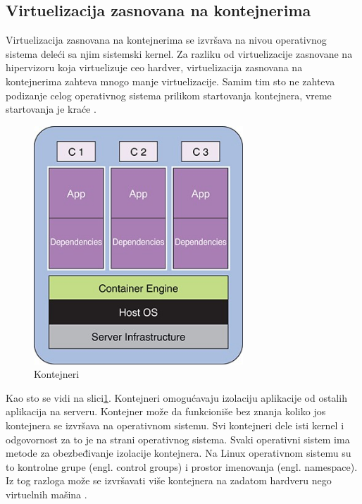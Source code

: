 \documentclass[12pt,oneside]{memoir}
\begin{document}
 
\subsection{Virtuelizacija zasnovana na kontejnerima}

Virtuelizacija zasnovana na kontejnerima se izvršava na nivou operativnog sistema deleći sa njim sistemski kernel. Za razliku od virtuelizacije zasnovane na hipervizoru koja virtuelizuje ceo hardver, virtuelizacija zasnovana na kontejnerima zahteva mnogo manje virtuelizacije. Samim tim sto ne zahteva podizanje celog operativnog sistema prilikom startovanja kontejnera, vreme startovanja je kraće \cite{gswc}. 
 
\begin{figure}[!ht]
  \centering
  \includegraphics[width=0.7\textwidth]{Slika 4.jpg}
  \caption{Kontejneri}
  \label{fig:kontejneri}
\end{figure}
 
Kao sto se vidi na slici\ref{fig:kontejneri}. Kontejneri omogućavaju izolaciju aplikacije od ostalih aplikacija na serveru. Kontejner može da funkcioniše bez znanja koliko jos kontejnera se izvršava na operativnom sistemu. Svi kontejneri dele isti kernel i odgovornost za to je na strani operativnog sistema. Svaki operativni sistem ima metode za obezbeđivanje izolacije kontejnera. Na Linux operativnom sistemu su to kontrolne grupe (engl. control groups) i prostor imenovanja (engl. namespace). Iz tog razloga može se izvršavati više kontejnera na zadatom hardveru nego virtuelnih mašina \cite{mac}. 
\end{document}
